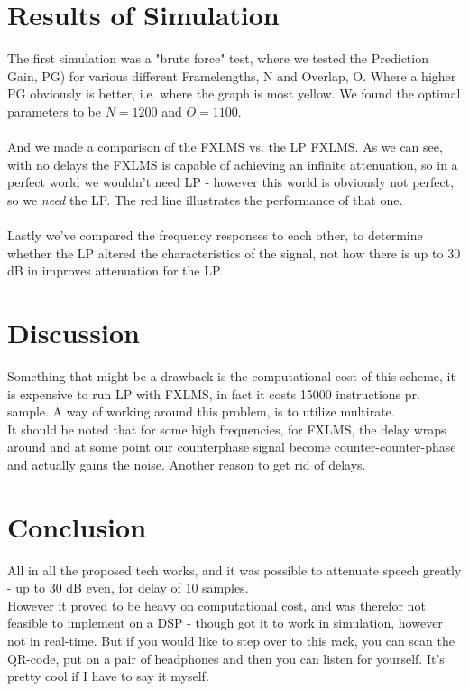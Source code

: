 \documentclass[12pt,a4paper,openright]{article}
\begin{document}
\section{Results of Simulation}
The first simulation was a "brute force" test, where we tested the Prediction Gain, PG) for various different Framelengths, N and Overlap, O. Where a higher PG obviously is better, i.e. where the graph is most yellow.
We found the optimal parameters to be $N=1200$ and $O=1100$.\\\\
And we made a comparison of the FXLMS vs. the LP FXLMS. As we can see, with no delays the FXLMS is capable of achieving an infinite attenuation, so in a perfect world we wouldn't need LP - however this world is obviously not perfect, so we \textit{need} the LP. The red line illustrates the performance of that one.\\\\
Lastly we've compared the frequency responses to each other, to determine whether the LP altered the characteristics of the signal, not how there is up to 30 dB in improves attenuation for the LP.\\

\section{Discussion}
Something that might be a drawback is the computational cost of this scheme, it is expensive to run LP with FXLMS, in fact it costs 15000 instructions pr. sample. A way of working around this problem, is to utilize multirate.\\
It should be noted that for some high frequencies, for FXLMS, the delay wraps around and at some point our counterphase signal become counter-counter-phase and actually gains the noise. Another reason to get rid of delays.

\section{Conclusion}
All in all the proposed tech works, and it was possible to attenuate speech greatly - up to 30 dB even, for delay of 10 samples.\\
However it proved to be heavy on computational cost, and was therefor not feasible to implement on a DSP - though got it to work in simulation, however not in real-time.
But if you would like to step over to this rack, you can scan the QR-code, put on a pair of headphones and then you can listen for yourself. It's pretty cool if I have to say it myself.
\end{document}
